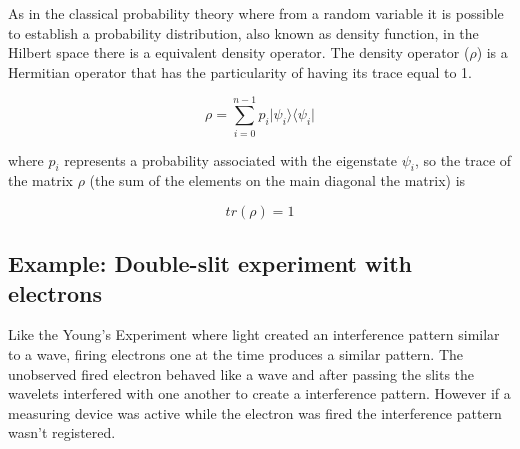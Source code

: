 
As in the classical probability theory where from a random variable it is possible to establish a probability distribution, also known as density function, in the Hilbert space there is a equivalent density operator.
The density operator ($\rho$) is a Hermitian operator that has the particularity of having its trace equal to 1\cite{VanRijsbergen2004}.

\begin{equation}
\label{eq_trace1}
\rho = \sum_{i=0}^{n-1} p_{i} \vert\psi_{i}\rangle\langle\psi_{i}\vert
\end{equation} 

where $p_{i}$ represents a probability associated with the eigenstate $\psi_{i}$, so the trace of the matrix $\rho$ (the sum of the elements on the main diagonal the matrix) is 

\begin{equation}
\label{eq_trace1}
tr( \rho ) = 1
\end{equation}




\subsection{Example: Double-slit experiment with electrons}
\label{subsubsec:double_slit}
 Like the Young's Experiment where light created an interference pattern similar to a wave, firing electrons one at the time produces a similar pattern. The unobserved fired electron behaved like a wave and after passing the slits the wavelets interfered with one another to create a interference pattern. However if a measuring device was active while the electron was fired the interference pattern wasn't registered. 

